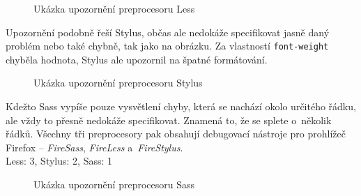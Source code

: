 \documentclass[thesis=B,czech]{FITthesis}[2012/06/26]
\begin{document}
\begin{figure}[htb]
	\begin{center}
	\end{center}
	\caption{Ukázka upozornění preprocesoru Less}
	\label{imgLess1}
\end{figure}
Upozornění podobně řeší Stylus, občas ale nedokáže specifikovat jasně daný problém nebo také chybně, tak jako na obrázku. Za vlastností \verb#font-weight# chyběla hodnota, Stylus ale upozornil na špatné formátování.
\begin{figure}[h]
	\begin{center}
	\end{center}
	\caption{Ukázka upozornění preprocesoru Stylus}
	\label{imgSass1}
\end{figure}

Kdežto Sass vypíše pouze vysvětlení chyby, která se nachází okolo určitého řádku, ale vždy to přesně nedokáže specifikovat. Znamená to, že se splete o~několik řádků. Všechny tři preprocesory pak obsahují debugovací nástroje pro prohlížeč Firefox -- \textit{FireSass}, \textit{FireLess} a~\textit{FireStylus}.\\
Less: 3, Stylus: 2, Sass: 1

\begin{figure}[h]
	\begin{center}
	\end{center}
	\caption{Ukázka upozornění preprocesoru Sass}
	\label{imgStyl1}
\end{figure}
\end{document}
